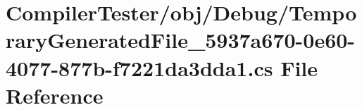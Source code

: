 \hypertarget{_compiler_tester_2obj_2_debug_2_temporary_generated_file__5937a670-0e60-4077-877b-f7221da3dda1_8cs}{}\section{Compiler\+Tester/obj/\+Debug/\+Temporary\+Generated\+File\+\_\+5937a670-\/0e60-\/4077-\/877b-\/f7221da3dda1.cs File Reference}
\label{_compiler_tester_2obj_2_debug_2_temporary_generated_file__5937a670-0e60-4077-877b-f7221da3dda1_8cs}
